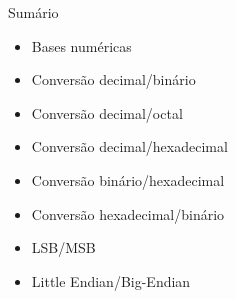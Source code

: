
\begin{frame}{Sumário}
    \begin{itemize}
        \item Bases numéricas
        \item Conversão decimal/binário
        \item Conversão decimal/octal
        \item Conversão decimal/hexadecimal
        \item Conversão binário/hexadecimal
        \item Conversão hexadecimal/binário
        \item LSB/MSB
        \item Little Endian/Big-Endian
    \end{itemize}
\end{frame}